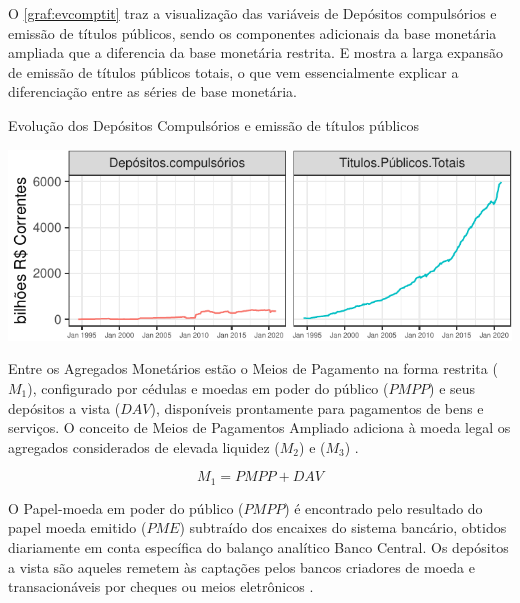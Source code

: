 \documentclass[
  12pt,
  12pt,
  openright,
  oneside,
  a4paper,
  chapter=TITLE,
  section=TITLE,
  subsection=TITLE,
  subsubsection=TITLE,
  english,
  portugues,
  sumario=tradicional]{abntex2}
\begin{document}
O \autoref{graf:evcomptit} traz a visualização das variáveis de Depósitos compulsórios e emissão de títulos públicos, sendo os componentes adicionais da base monetária ampliada que a diferencia da base monetária restrita. E mostra a larga expansão de emissão de títulos públicos totais, o que vem essencialmente explicar a diferenciação entre as séries de base monetária.

\begin{grafico}[!htbp]
\vspace{20pt}
\caption{Evolução dos Depósitos Compulsórios e emissão de títulos públicos}
\vspace{-4mm}

\begin{center}\includegraphics{12-exportedfigures/base.components-1} \end{center}
\vspace{-3mm}
\label{graf:evcomptit}
\vspace{-2mm}
\end{grafico}

Entre os Agregados Monetários estão o Meios de Pagamento na forma restrita (\(M_1\)), configurado por cédulas e moedas em poder do público (\(PMPP\)) e seus depósitos a vista (\(DAV\)), disponíveis prontamente para pagamentos de bens e serviços. O conceito de Meios de Pagamentos Ampliado adiciona à moeda legal os agregados considerados de elevada liquidez (\(M_2\)) e (\(M_3\)) \cite{bcb:2019, sgs:mpa}.

\begin{equation}
M_1 = PMPP + DAV
\end{equation}

O Papel-moeda em poder do público (\(PMPP\)) é encontrado pelo resultado do papel moeda emitido (\(PME\)) subtraído dos encaixes do sistema bancário, obtidos diariamente em conta específica do balanço analítico Banco Central. Os depósitos a vista são aqueles remetem às captações pelos bancos criadores de moeda e transacionáveis por cheques ou meios eletrônicos \cite{sgs:m1}.
\end{document}
